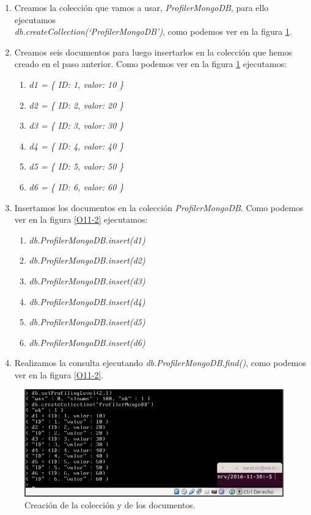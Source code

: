 \documentclass[a4paper,titlepage,12pt]{scrartcl}	%
\numberwithin{figure}{section} %
\numberwithin{table}{section} %
\begin{document}
	\begin{enumerate}
		\label{proceso_mongoDB}
		\item Creamos la colección que vamos a usar, \textit{ProfilerMongoDB}, para ello ejecutamos \\ \textit{db.createCollection(`ProfilerMongoDB')}, como podemos ver en la figura \ref{O11-1}.
		\item Creamos seis documentos para luego insertarlos en la colección que hemos creado en el paso anterior. Como podemos ver en la figura \ref{O11-1} ejecutamos:
		\begin{enumerate}
			\item \textit{d1 = \{ ID: 1, valor: 10 \}}
			\item \textit{d2 = \{ ID: 2, valor: 20 \}}
			\item \textit{d3 = \{ ID: 3, valor: 30 \}}
			\item \textit{d4 = \{ ID: 4, valor: 40 \}}
			\item \textit{d5 = \{ ID: 5, valor: 50 \}}
			\item \textit{d6 = \{ ID: 6, valor: 60 \}}
		\end{enumerate}
		\item Insertamos los documentos en la colección \textit{ProfilerMongoDB}. Como podemos ver en la figura \ref{O11-2} ejecutamos:
		\begin{enumerate}
			\item \textit{db.ProfilerMongoDB.insert(d1)}
			\item \textit{db.ProfilerMongoDB.insert(d2)}
			\item \textit{db.ProfilerMongoDB.insert(d3)}
			\item \textit{db.ProfilerMongoDB.insert(d4)}
			\item \textit{db.ProfilerMongoDB.insert(d5)}
			\item \textit{db.ProfilerMongoDB.insert(d6)}
		\end{enumerate}
		\item Realizamos la consulta ejecutando \textit{db.ProfilerMongoDB.find()}, como podemos ver en la figura \ref{O11-2}.
	\end{enumerate}
	
	\begin{figure}[H]
		\includegraphics[width=\linewidth]{./Imagenes/O11-1.png}
		\vspace{-0.5cm}
		\caption[Creación de la colección y de los documentos.]{Creación de la colección y de los documentos.}
		\label{O11-1}
	\end{figure}
	
\end{document}
